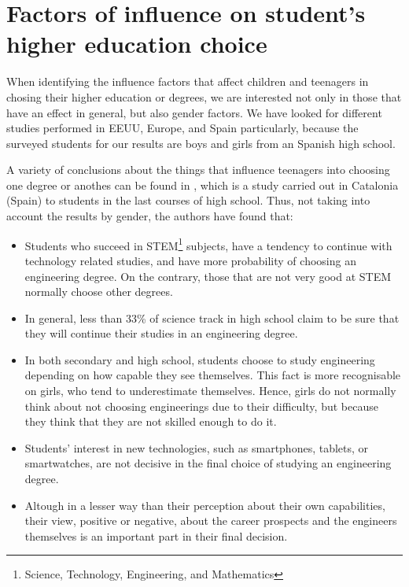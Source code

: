 \documentclass[journal,transmag]{IEEEtran}
\begin{document}
\section{Factors of influence on student's higher education choice}
\label{sec:factores}

When identifying the influence factors that affect children and teenagers in chosing their higher education or degrees, we are interested not only in those that have an effect in general, but also gender factors. We have looked for different studies performed in EEUU, Europe, and Spain particularly, because the surveyed students for our results are boys and girls from an Spanish high school.

A variety of conclusions about the things that influence teenagers into choosing one degree or anothes can be found in \cite{everis2012}, which is a study carried out in Catalonia (Spain) to students in the last courses of high school. Thus, not taking into account the results by gender, the authors have found that:

\begin{itemize}
	\item Students who succeed in STEM\footnote{Science, Technology, Engineering, and Mathematics} subjects, have a tendency to continue with technology related studies, and have more probability of choosing an engineering degree. On the contrary, those that are not very good at STEM normally choose other degrees.
	\item In general, less than 33\% of science track in high school claim to be sure that they will continue their studies in an engineering degree.
	\item In both secondary and high school, students choose to study engineering depending on how capable they see themselves. This fact is more recognisable on girls, who tend to underestimate themselves. Hence, girls do not normally think about not choosing engineerings due to their difficulty, but because they think that they are not skilled enough to do it.
	\item Students' interest in new technologies, such as smartphones, tablets, or smartwatches, are not decisive in the final choice of studying an engineering degree.
	\item Altough in a lesser way than their perception about their own capabilities, their view, positive or negative, about the career prospects and the engineers themselves is an important part in their final decision.
\end{itemize}
\end{document}
